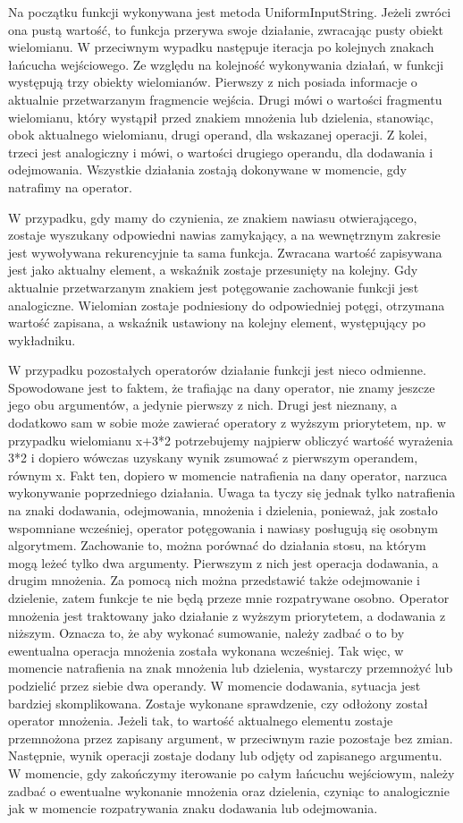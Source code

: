 \documentclass[twoside,a4paper]{book}
\begin{document}
Na początku funkcji wykonywana jest metoda UniformInputString. Jeżeli zwróci ona pustą wartość, to funkcja przerywa swoje działanie, zwracając pusty obiekt wielomianu. W przeciwnym wypadku następuje iteracja po kolejnych znakach łańcucha wejściowego. Ze względu na kolejność wykonywania działań, w funkcji występują trzy obiekty wielomianów. Pierwszy z nich posiada informacje o aktualnie przetwarzanym fragmencie wejścia. Drugi mówi o wartości fragmentu wielomianu, który wystąpił przed znakiem mnożenia lub dzielenia, stanowiąc, obok aktualnego wielomianu, drugi operand, dla wskazanej operacji. Z kolei, trzeci jest analogiczny i mówi, o wartości drugiego operandu, dla dodawania i odejmowania. Wszystkie działania zostają dokonywane w momencie, gdy natrafimy na operator.

W przypadku, gdy mamy do czynienia, ze znakiem nawiasu otwierającego, zostaje wyszukany odpowiedni nawias zamykający, a na wewnętrznym zakresie jest wywoływana rekurencyjnie ta sama funkcja. Zwracana wartość zapisywana jest jako aktualny element, a wskaźnik zostaje przesunięty na kolejny. Gdy aktualnie przetwarzanym znakiem jest potęgowanie zachowanie funkcji jest analogiczne. Wielomian zostaje podniesiony do odpowiedniej potęgi, otrzymana wartość zapisana, a wskaźnik ustawiony na kolejny element, występujący po wykładniku.

W przypadku pozostałych operatorów działanie funkcji jest nieco odmienne. Spowodowane jest to faktem, że trafiając na dany operator, nie znamy jeszcze jego obu argumentów, a jedynie pierwszy z nich. Drugi jest nieznany, a dodatkowo sam w sobie może zawierać operatory z wyższym priorytetem, np. w przypadku wielomianu x+3*2 potrzebujemy najpierw obliczyć wartość wyrażenia 3*2 i dopiero wówczas uzyskany wynik zsumować z pierwszym operandem, równym x. Fakt ten, dopiero w momencie natrafienia na dany operator, narzuca wykonywanie poprzedniego działania. Uwaga ta tyczy się jednak tylko natrafienia na znaki dodawania, odejmowania, mnożenia i dzielenia, ponieważ, jak zostało wspomniane wcześniej, operator potęgowania i nawiasy posługują się osobnym algorytmem. Zachowanie to, można porównać do działania stosu, na którym mogą leżeć tylko dwa argumenty. Pierwszym z nich jest operacja dodawania, a drugim mnożenia. Za pomocą nich można przedstawić także odejmowanie i dzielenie, zatem funkcje te nie będą przeze mnie rozpatrywane osobno. Operator mnożenia jest traktowany jako działanie z wyższym priorytetem, a dodawania z niższym. Oznacza to, że aby wykonać sumowanie, należy zadbać o to by ewentualna operacja mnożenia została wykonana wcześniej. Tak więc, w momencie natrafienia na znak mnożenia lub dzielenia, wystarczy przemnożyć lub podzielić przez siebie dwa operandy. W momencie dodawania, sytuacja jest bardziej skomplikowana. Zostaje wykonane sprawdzenie, czy odłożony został operator mnożenia. Jeżeli tak, to wartość aktualnego elementu zostaje przemnożona przez zapisany argument, w przeciwnym razie pozostaje bez zmian. Następnie, wynik operacji zostaje dodany lub odjęty od zapisanego argumentu. W momencie, gdy zakończymy iterowanie po całym łańcuchu wejściowym, należy zadbać o ewentualne wykonanie mnożenia oraz dzielenia, czyniąc to analogicznie jak w momencie rozpatrywania znaku dodawania lub odejmowania.
\\
\end{document}
